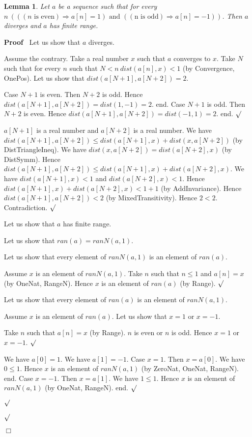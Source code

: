 \documentclass{article}
\newenvironment{forthel}{\begin{leftbar}}{\end{leftbar}}
\newenvironment{proof}{\noindent\textbf{Proof\ }}{\hspace*{\fill}$\Box$\medskip}
\newenvironment{subproof}{\begin{list}{}{}
		\item[\text{Proof}]}{\hfill $\surd$ \end{list}}
\newtheorem{lemma}{Lemma}
\begin{document}
\begin{forthel}
	\begin{lemma}
	Let $a$ be a sequence such that for every $n \ (((n \text{ is even}) \Rightarrow a[n] = 1) \text{ and } ((\text{n is odd}) \Rightarrow a[n] = -1))$.
	Then $a$ diverges and $a$ has finite range.
	\end{lemma}
	\begin{proof}
	Let us show that $a$ diverges.
	\begin{subproof}
	Assume the contrary.
	Take a real number $x$ such that $a$ converges to $x$.
	Take $N$ such that for every $n$ such that $N < n \ dist(a[n],x) < 1$ (by Convergence, OnePos).
	Let us show that $dist(a[N + 1],a[N + 2]) = 2$.
	\begin{subproof}
	Case $N + 1$ is even.
	Then $N + 2$ is odd.
	Hence $dist(a[N + 1],a[N + 2]) = dist(1,-1) = 2$.
	end.
	Case $N + 1$ is odd.
	Then $N + 2$ is even.
	Hence $dist(a[N + 1],a[N + 2]) = dist(-1,1) = 2$.
	end.
	\end{subproof}
	$a[N + 1]$ is a real number and $a[N + 2]$ is a real number.
	We have $dist(a[N + 1],a[N + 2]) \leq dist(a[N + 1],x) + dist(x,a[N + 2])$ (by DistTriangleIneq).
	We have $dist(x,a[N + 2]) = dist(a[N + 2],x)$ (by DistSymm).
	Hence $dist(a[N + 1],a[N + 2]) \leq dist(a[N + 1],x) + dist(a[N + 2],x)$.
	We have $dist(a[N + 1],x) < 1$ and $dist(a[N + 2],x) < 1$.
	Hence $dist(a[N + 1],x) + dist(a[N + 2],x) < 1 + 1$ (by AddInvariance).
	Hence $dist(a[N + 1],a[N + 2]) < 2$ (by MixedTransitivity).
	Hence $2 < 2$.
	Contradiction.
	\end{subproof}
	Let us show that $a$ has finite range.
	\begin{subproof}
	Let us show that $ran(a) = ranN(a,1)$.
	\begin{subproof}
	Let us show that every element of $ranN(a,1)$ is an element of $ran(a)$.
	\begin{subproof}
	Assume $x$ is an element of $ranN(a,1)$.
	Take $n$ such that $n \leq 1$ and $a[n] = x$ (by OneNat, RangeN).
	Hence $x$ is an element of $ran(a)$ (by Range).
	\end{subproof}
	Let us show that every element of $ran(a)$ is an element of $ranN(a,1)$.
	\begin{subproof}
	Assume $x$ is an element of $ran(a)$.
	Let us show that $x = 1$ or $x = -1$.
	\begin{subproof}
	Take $n$ such that $a[n] = x$ (by Range).
	$n$ is even or $n$ is odd.
	Hence $x = 1$ or $x = -1$.
	\end{subproof}
	We have $a[0] = 1$.
	We have $a[1] = -1$.
	Case $x = 1$.
	Then $x = a[0]$.
	We have $0 \leq 1$.
	Hence $x$ is an element of $ranN(a,1)$ (by ZeroNat, OneNat, RangeN).
	end.
	Case $x = -1$.
	Then $x = a[1]$. 
	We have $1 \leq 1$.
	Hence $x$ is an element of $ranN(a,1)$ (by OneNat, RangeN).
	end.
	\end{subproof}
	\end{subproof}
	\end{subproof}
	\end{proof}
	

\end{forthel}
\end{document}
